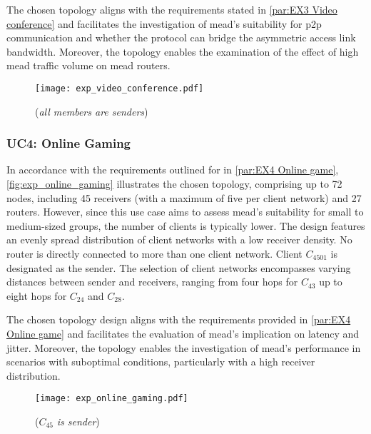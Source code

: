 The chosen topology aligns with the requirements stated in
    \autoref{par:EX3 Video conference} and facilitates the investigation of
    \gls{mead}'s suitability for \gls{p2p} communication and whether the
    protocol can bridge the asymmetric access link bandwidth.
Moreover, the topology enables the examination of the effect of high \gls{mead}
    traffic volume on \gls{mead} routers.

\begin{figure}
    \begin{center}
        \texttt{[image: exp\_video\_conference.pdf]}
    \end{center}
    \caption[UC3: P2P Video Conference]{\nuciii{} (\textit{all members are senders})}
    \label{fig:exp_video_conference}
\end{figure}

\subsubsection{UC4: Online Gaming} %
\label{par:EX4 Online Gaming}
In accordance with the requirements outlined for \uciv{} in
    \autoref{par:EX4 Online game}, \autoref{fig:exp_online_gaming}
    illustrates the chosen topology, comprising up to 72 nodes, including
    45 receivers (with a maximum of five per client network) and 27 routers.
However, since this use case aims to assess \gls{mead}'s suitability for small
    to medium-sized groups, the number of clients is typically lower.
The design features an evenly spread distribution of client networks with a low
    receiver density.
No router is directly connected to more than one client network.
Client $C_{4501}$ is designated as the sender.
The selection of client networks encompasses varying distances between sender
    and receivers, ranging from four hops for $C_{43}$ up to eight hops for
    $C_{24}$ and $C_{28}$.

The chosen topology design aligns with the requirements provided in
    \autoref{par:EX4 Online game} and facilitates the evaluation of \gls{mead}'s
    implication on latency and jitter.
Moreover, the topology enables the investigation of \gls{mead}'s performance in
    scenarios with suboptimal conditions, particularly with a high receiver
    distribution.

\begin{figure}
    \begin{center}
        \texttt{[image: exp\_online\_gaming.pdf]}
    \end{center}
    \caption[UC4: Online Gaming]{\nuciv{} ($C_{45}$ \textit{is sender})}
    \label{fig:exp_online_gaming}
\end{figure}


